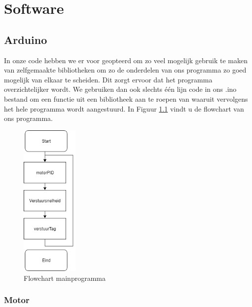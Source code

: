 
\chapter{Software}

\section{Arduino}

In onze code hebben we er voor geopteerd om zo veel mogelijk gebruik te maken van zelfgemaakte bibliotheken om zo de onderdelen van ons programma zo goed mogelijk van elkaar te scheiden. Dit zorgt ervoor dat het programma overzichtelijker wordt. We gebruiken dan ook slechts \'e\'en lijn code in ons .ino bestand om een functie uit een bibliotheek aan te roepen van waaruit vervolgens het hele programma wordt aangestuurd. In Figuur \ref{fig:flowchart} vindt u de flowchart van ons programma.

\begin{figure}[h]
\centering
\includegraphics[width=0.25\textwidth]{mainFlowchart.png}
\caption{Flowchart mainprogramma}
\label{fig:flowchart}
\end{figure}


\subsection{Motor}

